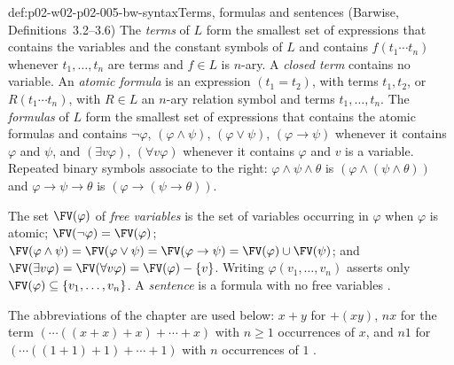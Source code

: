 \begin{hbdefinition}{def:p02-w02-p02-005-bw-syntax}{Terms, formulas and sentences (Barwise, Definitions~3.2--3.6)}
The \emph{terms} of \(L\) form the smallest set of expressions that contains
the variables and the constant symbols of \(L\) and contains
\(f(t_1\cdots t_n)\) whenever \(t_1,\ldots,t_n\) are terms and \(f\in L\) is
\(n\)-ary.  A \emph{closed term} contains no variable.  An \emph{atomic
formula} is an expression \((t_1=t_2)\), with terms \(t_1,t_2\), or
\(R(t_1\cdots t_n)\), with \(R\in L\) an \(n\)-ary relation symbol and terms
\(t_1,\ldots,t_n\).  The \emph{formulas} of \(L\) form the smallest set of
expressions that contains the atomic formulas and contains
\(\neg\varphi\), \((\varphi\land\psi)\), \((\varphi\lor\psi)\),
\((\varphi\to\psi)\) whenever it contains \(\varphi\) and \(\psi\), and
\((\exists v\varphi)\), \((\forall v\varphi)\) whenever it contains
\(\varphi\) and \(v\) is a variable.  Repeated binary symbols associate to
the right: \(\varphi\land\psi\land\theta\) is
\((\varphi\land(\psi\land\theta))\) and \(\varphi\to\psi\to\theta\) is
\((\varphi\to(\psi\to\theta))\).

The set \(\FV(\varphi)\) of \emph{free variables} is the set of variables
occurring in \(\varphi\) when \(\varphi\) is atomic;
\(\FV(\neg\varphi)=\FV(\varphi)\);
\(\FV(\varphi\land\psi)=\FV(\varphi\lor\psi)=\FV(\varphi\to\psi)
=\FV(\varphi)\cup\FV(\psi)\); and
\(\FV(\exists v\varphi)=\FV(\forall v\varphi)=\FV(\varphi)-\{v\}\).
Writing \(\varphi(v_1,\ldots,v_n)\) asserts only
\(\FV(\varphi)\subseteq\{v_1,\ldots,v_n\}\).  A \emph{sentence} is a
formula with no free variables
\cite[ch.~A.1, \S3, Definitions~3.2--3.6, pp.~18--20]{Barwise1977FirstOrder}.
\end{hbdefinition}

The abbreviations of the chapter are used below: \(x+y\) for \(+(xy)\),
\(nx\) for the term \((\cdots((x+x)+x)+\cdots+x)\) with \(n\geq1\)
occurrences of \(x\), and \(n1\) for \((\cdots((1+1)+1)+\cdots+1)\) with
\(n\) occurrences of \(1\) \cite[ch.~A.1, \S2, pp.~8, 12; \S3, p.~18]{Barwise1977FirstOrder}.

